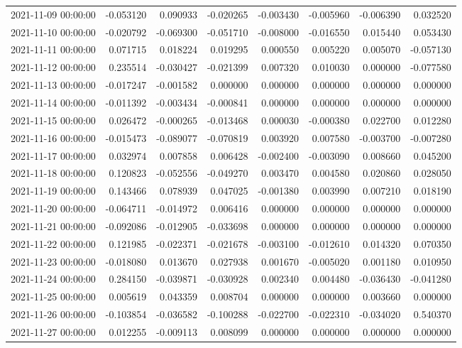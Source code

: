 \begin{tabular}{lrrrrrrr}
2021-11-09 00:00:00 & -0.053120 & 0.090933 & -0.020265 & -0.003430 & -0.005960 & -0.006390 & 0.032520 \\
2021-11-10 00:00:00 & -0.020792 & -0.069300 & -0.051710 & -0.008000 & -0.016550 & 0.015440 & 0.053430 \\
2021-11-11 00:00:00 & 0.071715 & 0.018224 & 0.019295 & 0.000550 & 0.005220 & 0.005070 & -0.057130 \\
2021-11-12 00:00:00 & 0.235514 & -0.030427 & -0.021399 & 0.007320 & 0.010030 & 0.000000 & -0.077580 \\
2021-11-13 00:00:00 & -0.017247 & -0.001582 & 0.000000 & 0.000000 & 0.000000 & 0.000000 & 0.000000 \\
2021-11-14 00:00:00 & -0.011392 & -0.003434 & -0.000841 & 0.000000 & 0.000000 & 0.000000 & 0.000000 \\
2021-11-15 00:00:00 & 0.026472 & -0.000265 & -0.013468 & 0.000030 & -0.000380 & 0.022700 & 0.012280 \\
2021-11-16 00:00:00 & -0.015473 & -0.089077 & -0.070819 & 0.003920 & 0.007580 & -0.003700 & -0.007280 \\
2021-11-17 00:00:00 & 0.032974 & 0.007858 & 0.006428 & -0.002400 & -0.003090 & 0.008660 & 0.045200 \\
2021-11-18 00:00:00 & 0.120823 & -0.052556 & -0.049270 & 0.003470 & 0.004580 & 0.020860 & 0.028050 \\
2021-11-19 00:00:00 & 0.143466 & 0.078939 & 0.047025 & -0.001380 & 0.003990 & 0.007210 & 0.018190 \\
2021-11-20 00:00:00 & -0.064711 & -0.014972 & 0.006416 & 0.000000 & 0.000000 & 0.000000 & 0.000000 \\
2021-11-21 00:00:00 & -0.092086 & -0.012905 & -0.033698 & 0.000000 & 0.000000 & 0.000000 & 0.000000 \\
2021-11-22 00:00:00 & 0.121985 & -0.022371 & -0.021678 & -0.003100 & -0.012610 & 0.014320 & 0.070350 \\
2021-11-23 00:00:00 & -0.018080 & 0.013670 & 0.027938 & 0.001670 & -0.005020 & 0.001180 & 0.010950 \\
2021-11-24 00:00:00 & 0.284150 & -0.039871 & -0.030928 & 0.002340 & 0.004480 & -0.036430 & -0.041280 \\
2021-11-25 00:00:00 & 0.005619 & 0.043359 & 0.008704 & 0.000000 & 0.000000 & 0.003660 & 0.000000 \\
2021-11-26 00:00:00 & -0.103854 & -0.036582 & -0.100288 & -0.022700 & -0.022310 & -0.034020 & 0.540370 \\
2021-11-27 00:00:00 & 0.012255 & -0.009113 & 0.008099 & 0.000000 & 0.000000 & 0.000000 & 0.000000 \\

\end{tabular}

